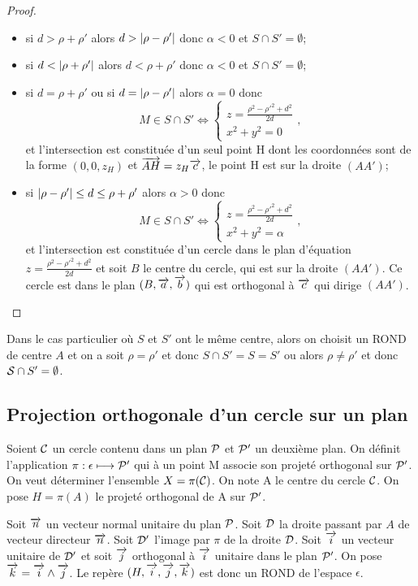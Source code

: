 \begin{proof}
\begin{itemize}
  \item si $d>\rho+\rho'$ alors $d>\abs{\rho-\rho'}$ donc $\alpha<0$ et $S\cap S'=\emptyset$;
  \item si $d<\abs{\rho+\rho'}$ alors $d<\rho+\rho'$ donc $\alpha<0$ et $S\cap S'=\emptyset$;
  \item si $d=\rho+\rho'$ ou si $d=\abs{\rho-\rho'}$ alors $\alpha=0$ donc
    \begin{equation}
      M\in S\cap S' \iff \begin{cases} z=\frac{\rho^2-\rho'^2+d^2}{2d} \\x^2+y^2=0\end{cases},
    \end{equation}
    et l'intersection est constituée d'un seul point H dont les coordonnées sont de la forme $(0,0,z_H)$ et $\vect{AH}=z_H \vc$, le point H est sur la droite $(AA')$;
  \item si $\abs{\rho-\rho'}\leq d \leq \rho+\rho'$ alors $\alpha>0$ donc
    \begin{equation}
      M\in S\cap S' \iff \begin{cases} z=\frac{\rho^2-\rho'^2+d^2}{2d} \\x^2+y^2=\alpha\end{cases},
    \end{equation}
    et l'intersection est constituée d'un cercle dans le plan d'équation $z=\frac{\rho^2-\rho'^2+d^2}{2d}$ et soit $B$ le centre du cercle, qui est sur la droite $(AA')$. Ce cercle est dans le plan $(B,\va,\vb)$ qui est orthogonal à $\vc$ qui dirige $(AA')$.
  \end{itemize}
\end{proof}
Dans le cas particulier où $S$ et $S'$ ont le même centre, alors on choisit un ROND de centre $A$ et on a soit $\rho=\rho'$ et donc $S\cap S'=S=S'$ ou alors $\rho\neq \rho'$ et donc $\S\cap S' =\emptyset$.

\subsection{Projection orthogonale d'un cercle sur un plan}

Soient $\courbe$ un cercle contenu dans un plan $\P$ et $\P'$ un deuxième plan. On définit l'application $\pi:\epsilon \longmapsto \P'$ qui à un point M associe son projeté orthogonal sur $\P'$. On veut déterminer l'ensemble $X=\pi(\courbe)$. On note A le centre du cercle $\courbe$. On pose $H=\pi(A)$ le projeté orthogonal de A sur $\P'$. 

Soit $\vn$ un vecteur normal unitaire du plan $\P$. Soit $\Dr$ la droite passant par $A$ de vecteur directeur $\vn$. Soit $\Dr'$ l'image par $\pi$ de la droite $\Dr$. Soit $\vi$ un vecteur unitaire de $\Dr'$ et soit $\vj$ orthogonal à $\vi$ unitaire dans le plan $\P'$. On pose $\vk=\vi\wedge \vj$. Le repère $(H,\vi,\vj,\vk)$ est donc un ROND de l'espace $\epsilon$.

